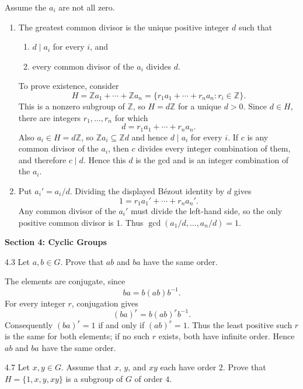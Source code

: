 \documentclass[11pt]{article}
\newcommand{\sectionheading}[1]{%
  \vspace{0.25em}
  {\color{darkgray}\large\bfseries #1}\par
}
\newcommand{\Z}{\mathbb{Z}}
\begin{document}
\begin{solution}
Assume the $a_i$ are not all zero.
\begin{enumerate}[label=\textbf{(\alph*)}]
  \item The greatest common divisor is the unique positive integer $d$
  such that
  \begin{enumerate}[label=(\roman*), leftmargin=2.2em]
    \item $d\mid a_i$ for every $i$, and
    \item every common divisor of the $a_i$ divides $d$.
  \end{enumerate}
  To prove existence, consider
  \[
    H=\Z a_1+\cdots+\Z a_n
     =\{r_1a_1+\cdots+r_na_n:r_i\in\Z\}.
  \]
  This is a nonzero subgroup of $\Z$, so $H=d\Z$ for a unique $d>0$.
  Since $d\in H$, there are integers $r_1,\ldots,r_n$ for which
  \[
    d=r_1a_1+\cdots+r_na_n.
  \]
  Also $a_i\in H=d\Z$, so $\Z a_i\subseteq\Z d$ and hence $d\mid a_i$ for every $i$.  If $c$ is any
  common divisor of the $a_i$, then $c$ divides every integer combination
  of them, and therefore $c\mid d$.  Hence this $d$ is the gcd and is an
  integer combination of the $a_i$.

  \item Put $a_i'=a_i/d$.  Dividing the displayed B\'ezout identity by
  $d$ gives
  \[
    1=r_1a_1'+\cdots+r_na_n'.
  \]
  Any common divisor of the $a_i'$ must divide the left-hand side, so the
  only positive common divisor is $1$.  Thus
  $\gcd(a_1/d,\ldots,a_n/d)=1$.
\end{enumerate}
\end{solution}

\sectionheading{Section 4: Cyclic Groups}

\begin{exercise}{4.3}
Let $a,b\in G$. Prove that $ab$ and $ba$ have the same order.
\end{exercise}

\begin{solution}
The elements are conjugate, since
\[
  ba=b(ab)b^{-1}.
\]
For every integer $r$, conjugation gives
\[
  (ba)^r=b(ab)^rb^{-1}.
\]
Consequently $(ba)^r=1$ if and only if $(ab)^r=1$.  Thus the least
positive such $r$ is the same for both elements; if no such $r$ exists,
both have infinite order.  Hence $ab$ and $ba$ have the same order.
\end{solution}

\begin{exercise}{4.7}
Let $x,y\in G$. Assume that $x$, $y$, and $xy$ each have order $2$.
Prove that $H=\{1,x,y,xy\}$ is a subgroup of $G$ of order $4$.
\end{exercise}
\end{document}
